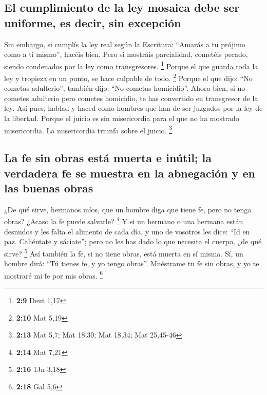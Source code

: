 \begin{paracol}{2}
\hypertarget{el-cumplimiento-de-la-ley-mosaica-debe-ser-uniforme-es-decir-sin-excepciuxf3n}{%
\subsection{El cumplimiento de la ley mosaica debe ser uniforme, es
decir, sin
excepción}\label{el-cumplimiento-de-la-ley-mosaica-debe-ser-uniforme-es-decir-sin-excepciuxf3n}}

 Sin embargo, si cumplís la ley real según la Escritura:
``Amarás a tu prójimo como a ti mismo'', hacéis bien. 
Pero si mostráis parcialidad, cometéis pecado, siendo condenados por la
ley como transgresores. \footnote{\textbf{2:9} Deut 1,17}
 Porque el que guarda toda la ley y tropieza en un punto,
se hace culpable de todo. \footnote{\textbf{2:10} Mat 5,19}
 Porque el que dijo: ``No cometas adulterio'', también
dijo: ``No cometas homicidio''. Ahora bien, si no cometes adulterio pero
cometes homicidio, te has convertido en transgresor de la ley.
 Así pues, hablad y haced como hombres que han de ser
juzgados por la ley de la libertad.  Porque el juicio es
sin misericordia para el que no ha mostrado misericordia. La
misericordia triunfa sobre el juicio. \footnote{\textbf{2:13} Mat 5,7;
  Mat 18,30; Mat 18,34; Mat 25,45-46}

\hypertarget{la-fe-sin-obras-estuxe1-muerta-e-inuxfatil-la-verdadera-fe-se-muestra-en-la-abnegaciuxf3n-y-en-las-buenas-obras}{%
\subsection{La fe sin obras está muerta e inútil; la verdadera fe se
muestra en la abnegación y en las buenas
obras}\label{la-fe-sin-obras-estuxe1-muerta-e-inuxfatil-la-verdadera-fe-se-muestra-en-la-abnegaciuxf3n-y-en-las-buenas-obras}}

 ¿De qué sirve, hermanos míos, que un hombre diga que
tiene fe, pero no tenga obras? ¿Acaso la fe puede salvarle? \footnote{\textbf{2:14}
  Mat 7,21}  Y si un hermano o una hermana están desnudos
y les falta el alimento de cada día,  y uno de vosotros
les dice: ``Id en paz. Caliéntate y sáciate''; pero no les has dado lo
que necesita el cuerpo, ¿de qué sirve? \footnote{\textbf{2:16} 1Jn 3,18}
 Así también la fe, si no tiene obras, está muerta en sí
misma.  Sí, un hombre dirá: ``Tú tienes fe, y yo tengo
obras''. Muéstrame tu fe sin obras, y yo te mostraré mi fe por mis
obras. \footnote{\textbf{2:18} Gal 5,6}


\end{paracol}
